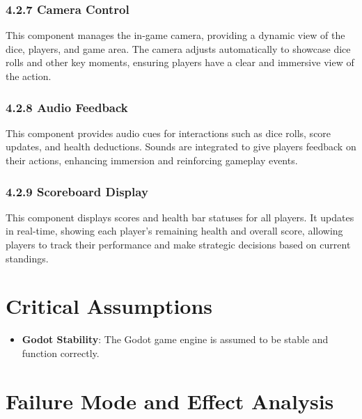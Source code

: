 \documentclass{article}
\begin{document}
\subsubsection*{4.2.7 Camera Control}
This component manages the in-game camera, providing a dynamic view of the dice, players, and game area. The camera adjusts automatically to showcase dice rolls and other key moments, ensuring players have a clear and immersive view of the action.

\subsubsection*{4.2.8 Audio Feedback}
This component provides audio cues for interactions such as dice rolls, score updates, and health deductions. Sounds are integrated to give players feedback on their actions, enhancing immersion and reinforcing gameplay events.

\subsubsection*{4.2.9 Scoreboard Display}
This component displays scores and health bar statuses for all players. It updates in real-time, showing each player's remaining health and overall score, allowing players to track their performance and make strategic decisions based on current standings.

\section{Critical Assumptions}

\begin{itemize}
    \item \textbf{Godot Stability}: The Godot game engine is assumed to be stable and function correctly.
\end{itemize}

\section{Failure Mode and Effect Analysis}
\end{document}
